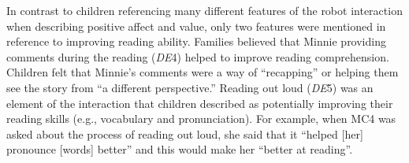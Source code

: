 \documentclass{sigchi}
\begin{document}
%	

In contrast to children referencing many different features of the robot interaction when describing positive affect and value, only two features were mentioned in reference to improving reading ability. Families believed that Minnie providing comments during the reading (\textit{DE}4) helped to improve reading comprehension. Children felt that Minnie's comments were a way of ``recapping'' or helping them see the story from ``a different perspective.'' Reading out loud (\textit{DE}5) was an element of the interaction that children described as potentially improving their reading skills (e.g., vocabulary and pronunciation). For example, when MC4 was asked about the process of reading out loud, she said that it ``helped [her] pronounce [words] better'' and this would make her ``better at reading''.
\end{document}
